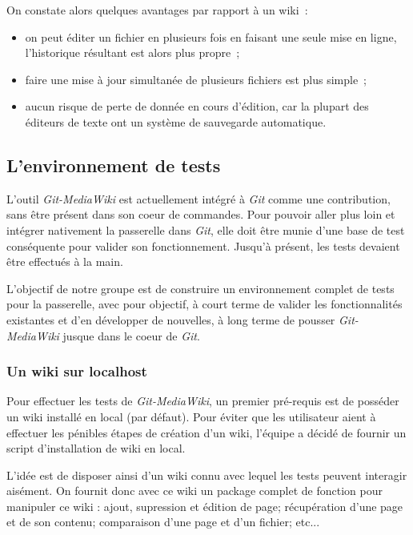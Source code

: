 \documentclass[11pt]{article}
\begin{document}
On constate alors quelques avantages par rapport à un wiki~:

\begin{itemize}
\item on peut éditer un fichier en plusieurs fois en faisant une seule
  mise en ligne, l'historique résultant est alors plus propre~;
\item faire une mise à jour simultanée de plusieurs fichiers est plus simple~;
\item aucun risque de perte de donnée en cours d'édition, car la plupart
  des éditeurs de texte ont un système de sauvegarde automatique.
\end{itemize}

\subsection{L'environnement de tests}

L'outil \textit{Git-MediaWiki} est actuellement intégré à \textit{Git}
comme une contribution, sans être présent dans son coeur de
commandes. Pour pouvoir aller plus loin et intégrer nativement la
passerelle dans \textit{Git}, elle doit être munie d'une base de test
conséquente pour valider son fonctionnement. Jusqu'à présent, les
tests devaient être effectués à la main.

L'objectif de notre groupe est de construire un environnement complet
de tests pour la passerelle, avec pour objectif, à court terme de
valider les fonctionnalités existantes et d'en développer de
nouvelles, à long terme de pousser \textit{Git-MediaWiki} jusque
dans le coeur de \textit{Git}.

\subsubsection{Un wiki sur localhost}

Pour effectuer les tests de \textit{Git-MediaWiki}, un premier 
pré-requis est de posséder un wiki installé en local (par défaut). Pour éviter que les utilisateur aient à effectuer les pénibles étapes de création d'un wiki, l'équipe a décidé de fournir un script d'installation de wiki en local.

L'idée est de disposer ainsi d'un wiki connu avec lequel les tests 
peuvent interagir aisément. On fournit donc avec ce wiki un 
package complet de fonction pour manipuler ce wiki : ajout, 
supression et édition de page; récupération d'une page et de son 
contenu; comparaison d'une page et d'un fichier; etc...
\end{document}
